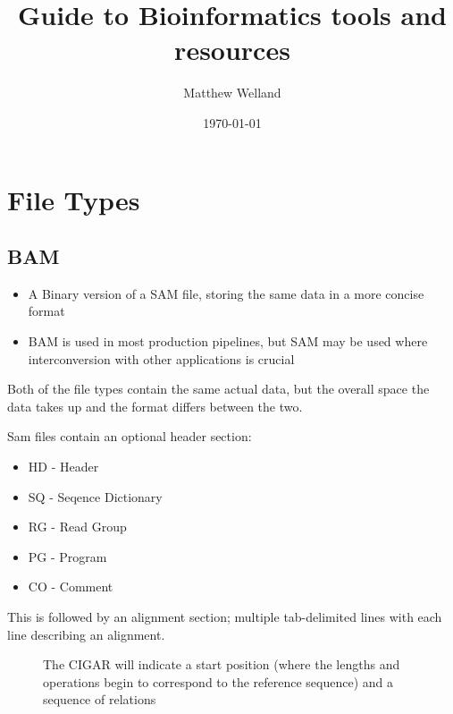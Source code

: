 \documentclass[12pt]{report}
\begin{document}
\title{Guide to Bioinformatics tools and resources}
\author{Matthew Welland}
\date{\today}
\maketitle	
	
\chapter*{File Types}


\section*{BAM}
\begin{itemize}
	\item A Binary version of a SAM file, storing the same data in a more concise format
	\item BAM is used in most production pipelines, but SAM may be used where interconversion with other applications is crucial
\end{itemize}

Both of the file types contain the same actual data, but the overall space the data takes up and the format differs between the two. 

Sam files contain an optional header section:
\begin{itemize}
	\item HD - Header
	\item SQ - Seqence Dictionary
	\item RG - Read Group
	\item PG - Program
	\item CO - Comment
\end{itemize}
This is followed by an alignment section; multiple tab-delimited lines with each line describing an alignment.

\begin{figure}[!ht]
	\centering
	\caption{The CIGAR will indicate a start position (where the lengths and operations begin to correspond to the reference sequence) and a sequence of relations}\label{cigar}
\end{figure}
\end{document}
